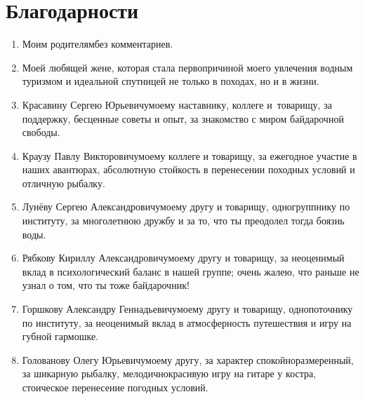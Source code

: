 \newpage
{
\thispagestyle{empty}
\section*{Благодарности}

\begin{enumerate}
\item Моим родителям\mdash без комментариев.
%
\item Моей любящей жене, которая стала первопричиной моего увлечения водным туризмом и идеальной спутницей не только в походах, но и в жизни.
%
\item Красавину\: Сергею\: Юрьевичу\mdash моему наставнику, коллеге и~товарищу, за поддержку, бесценные советы и опыт, за знакомство с миром байдарочной свободы.
%
\item Краузу\: Павлу\: Викторовичу\mdash моему коллеге и товарищу, за ежегодное участие в наших авантюрах, абсолютную стойкость в перенесении походных условий и отличную рыбалку.
%
\item Лунёву\: Сергею\: Александровичу\mdash моему другу и товарищу, одногруппнику по институту, за многолетнюю дружбу и за то, что ты преодолел тогда боязнь воды.
%
\item Рябкову\: Кириллу\: Александровичу\mdash моему другу и товарищу, за неоценимый вклад в психологический баланс в нашей группе; очень жалею, что раньше не узнал о том, что ты тоже байдарочник!
%
\item Горшкову\: Александру\: Геннадьевичу\mdash моему другу и товарищу, однопоточнику по институту, за неоценимый вклад в атмосферность путешествия и игру на губной гармошке.
%
\item Голованову\: Олегу\: Юрьевичу\mdash моему другу, за характер спокойно\sdash размеренный, за шикарную рыбалку, мелодично\sdash красивую игру на гитаре у костра, стоическое перенесение погодных условий.

\end{enumerate}
}
